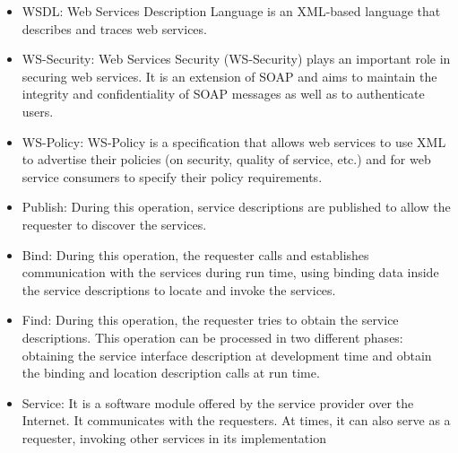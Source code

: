 \begin{itemize}
    \item WSDL: Web Services Description Language is an XML-based language that describes and traces web services.
    \item WS-Security: Web Services Security (WS-Security) plays an important role in securing web services. It is an extension of SOAP and aims to maintain the integrity and confidentiality of SOAP messages as well as to authenticate users.
    \item WS-Policy: WS-Policy is a specification that allows web services to use XML to advertise their policies (on security, quality of service, etc.) and for web service consumers to specify their policy requirements.
    \item Publish: During this operation, service descriptions are published to allow the requester to discover the services.
    \item Bind: During this operation, the requester calls and establishes communication with the services during run time, using binding data inside the service descriptions to locate and invoke the services.
    \item Find: During this operation, the requester tries to obtain the service descriptions. This operation can be processed in two different phases: obtaining the service interface description at development time and obtain the binding and location description calls at run time.
    \item Service: It is a software module offered by the service provider over the Internet. It communicates with the requesters. At times, it can also serve as a requester, invoking other services in its implementation
    
       
\end{itemize}
